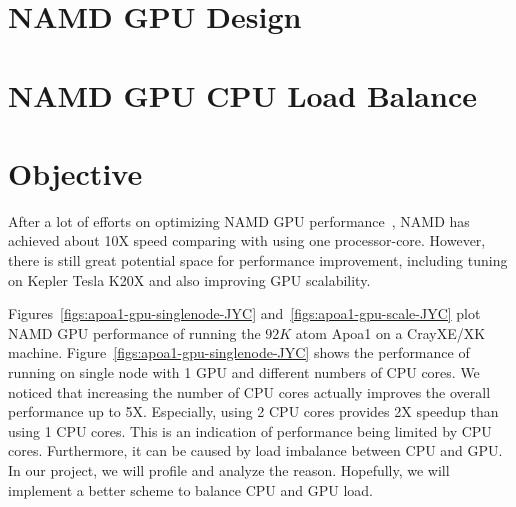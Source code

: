 \documentclass[11pt,onecolumn]{article}
\newcommand{\namd}{\textsc{namd}}
\begin{document}

\section{NAMD GPU Design } 


\section{NAMD GPU CPU Load Balance}


\section{Objective}
After a lot of efforts on optimizing NAMD GPU performance~\cite{phillips_stone_namd_cuda}, NAMD has achieved 
about 10X speed comparing with using one processor-core. However, there is still great
potential space for performance improvement, including tuning on Kepler Tesla K20X and
also improving GPU scalability.

Figures~\ref{figs:apoa1-gpu-singlenode-JYC} and~\ref{figs:apoa1-gpu-scale-JYC}
plot NAMD GPU performance of running the $92K$ atom Apoa1 on a CrayXE/XK machine.
Figure~\ref{figs:apoa1-gpu-singlenode-JYC} shows the performance of running on 
single node with 1 GPU and different numbers of CPU cores. We noticed that increasing
the number of CPU cores actually improves the overall performance up to 5X. Especially, 
using 2 CPU cores provides 2X speedup than using 1 CPU cores.
This is an indication of performance being limited by CPU cores. Furthermore, 
it can be caused by load imbalance between CPU and GPU. In our project, we will profile
and analyze the reason. Hopefully, we will implement a better scheme to balance CPU and GPU load.
\end{document}
